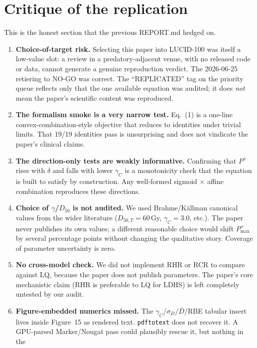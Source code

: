 \documentclass[11pt]{article}
\begin{document}
\section{Critique of the replication}
This is the honest section that the previous REPORT.md hedged on.
\begin{enumerate}
\item \textbf{Choice-of-target risk.} Selecting this paper into LUCID-100
      was itself a low-value slot: a review in a
      predatory-adjacent venue, with no released code or data, cannot
      generate a genuine reproduction verdict. The 2026-06-25 retiering
      to NO-GO was correct. The ``REPLICATED'' tag on the priority queue
      reflects only that the one available equation was audited; it does
      \emph{not} mean the paper's scientific content was reproduced.
\item \textbf{The formalism smoke is a very narrow test.} Eq.~(1) is a
      one-line convex-combination-style objective that reduces to
      identities under trivial limits. That 19/19 identities pass is
      unsurprising and does not vindicate the paper's clinical claims.
\item \textbf{The direction-only tests are weakly informative.}
      Confirming that $P^{+}$ rises with $\delta$ and falls with lower
      $\gamma_C$ is a monotonicity check that the equation is built to
      satisfy by construction. Any well-formed sigmoid $\times$ affine
      combination reproduces these directions.
\item \textbf{Choice of $\gamma$/$D_{50}$ is not audited.} We used
      Brahme/K\"allman canonical values from the wider literature
      ($D_{50,T}=60$\,Gy, $\gamma_C=3.0$, etc.). The paper never
      publishes its own values; a different reasonable choice would
      shift $P^{+}_{\max}$ by several percentage points without changing
      the qualitative story. Coverage of parameter uncertainty is zero.
\item \textbf{No cross-model check.} We did not implement RHR or RCR to
      compare against LQ, because the paper does not publish parameters.
      The paper's core mechanistic claim (RHR is preferable to LQ for
      LDHS) is left completely untested by our audit.
\item \textbf{Figure-embedded numerics missed.} The $\gamma_C$/$\sigma_D/\bar{D}$/RBE
      tabular insert lives inside Figure~15 as rendered text.
      \texttt{pdftotext} does not recover it. A GPU-parsed
      Marker/Nougat pass could plausibly rescue it, but nothing in the

\end{enumerate}
\end{document}
